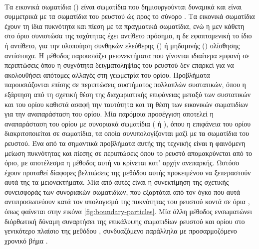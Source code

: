 \paragraph{} Τα εικονικά σωματίδια () είναι σωματίδια που
δημιουργούνται δυναμικά και είναι συμμετρικά με τα σωματίδια του ρευστού ώς προς το σύνορο
\cite{colagrossi2003448}. Τα εικονικά σωματίδια έχουν τη ίδια πυκνότητα και πίεση με τα
πραγματικά σωματίδια, ενώ η μεν κάθετη στο όριο συνιστώσα της ταχύτητας έχει αντίθετο
πρόσημο, η δε εφαπτομενική το ίδιο ή αντίθετο, για την υλοποίηση συνθηκών ελεύθερης
() ή μηδαμινής () ολίσθησης αντίστοιχα. Η μέθοδος παρουσιάζει
μειονεκτήματα που γίνονται ιδιαίτερα εμφανή σε περιπτώσεις όπου η συχνότητα δειγματοληψίας
του ρευστού δεν επαρκεί για να ακολουθήσει απότομες αλλαγές στη γεωμετρία του
ορίου. Προβλήματα παρουσιάζονται επίσης σε περιπτώσεις συστήματος πολλαπλών συστατικών,
όπου η εξάρτηση από τη σχετική θέση της διαχωριστικής επιφάνειας μεταξύ των συστατικών και
του ορίου καθιστά ασαφή την ταυτότητα και τη θέση των εικονικών σωματιδίων για την
αναπαράσταση του ορίου. Μία παρόμοια προσέγγιση αποτελεί η αναπαράσταση του ορίου με
συνοριακά σωματίδια ( ή ), όπου η επιφάνεια του ορίου
διακριτοποιείται σε σωματίδια, τα οποία συνυπολογίζονται μαζί με τα σωματίδια του
ρευστού. Ένα από τα σημαντικά προβλήματα αυτής της τεχνικής είναι η φαινόμενη μείωση
πυκνότητας και πίεσης σε περιπτώσεις όπου το ρευστό απομακρύνεται από το όριο, με
αποτέλεσμα η μέθοδος αυτή να κρίνεται κατ' αρχήν ανεπαρκής. Ωστόσο έχουν προταθεί δίαφορες
βελτιώσεις της μεθόδου αυτής προκειμένου να ξεπεραστούν αυτά της τα μειονεκτήματα. Μία από
αυτές είναι η συνεκτίμηση της σχετικής συνεισφοράς των συνοριακών σωματιδίων, που
εξαρτάται από τον όγκο που αυτά αντιπροσωπεύουν κατά τον υπολογισμό της πυκνότητας του
ρευστού κοντά σε όρια \cite{akinci2012versatile}, όπως φαίνεται στην εικόνα
\ref{fig:boundary-particles}. Μία άλλη μέθοδος ενσωματώνει διόρθωτική δύναμη συναρτήσει
της επικάλυψης σωματιδίων ρευστού και ορίου στο γενικότερο πλαίσιο της μεθόδου , συνδυαζόμενο παράλληλα με προσαρμοζόμενο
χρονικό βήμα \cite{bender2010boundary}.

